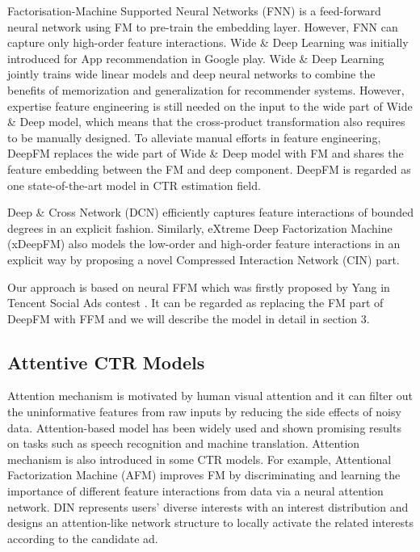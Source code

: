\documentclass{article}
\begin{document}
Factorisation-Machine Supported Neural Networks (FNN)\cite{zhang2016deep} is a feed-forward neural network using FM to pre-train the embedding layer. However, FNN can capture only high-order feature interactions. Wide \& Deep Learning\cite{cheng2016wide} was initially introduced for App recommendation in Google play. Wide \& Deep Learning jointly trains wide linear models and deep neural networks to combine the benefits of memorization and generalization for recommender systems. However, expertise feature engineering is still needed on the input to the wide part of Wide \& Deep model, which means that the cross-product transformation also requires to be manually designed. To alleviate manual efforts in feature engineering, DeepFM\cite{guo2017deepfm} replaces the wide part of Wide \& Deep model with FM and shares the feature embedding between the FM and deep component.  DeepFM is regarded as one state-of-the-art model in CTR estimation field.


Deep \& Cross Network (DCN)\cite{wang2017deep} efficiently captures feature interactions of bounded degrees in an explicit fashion. Similarly, eXtreme Deep Factorization Machine (xDeepFM) \cite{lian2018xdeepfm} also models the low-order and high-order feature interactions in an explicit way by proposing a novel Compressed Interaction Network (CIN) part. 


Our approach is based on neural FFM which was firstly proposed by Yang\cite{yang2017} in Tencent Social Ads contest . It can be regarded as replacing the FM part of DeepFM with FFM and we will describe the model in detail in section 3.

\subsection{Attentive CTR Models}
Attention mechanism is motivated by human visual attention and it can filter out the uninformative features from raw inputs by reducing the side effects of noisy data. Attention-based model has been widely used and shown promising results on tasks such as speech recognition and machine translation. Attention mechanism is also introduced in some CTR models. For example, Attentional  Factorization Machine (AFM)\cite{xiao2017attentional} improves FM by discriminating and learning the importance of different feature interactions from data via a neural attention network. DIN\cite{zhou2018deep} represents users' diverse interests with an interest distribution and designs an attention-like network structure to locally activate the related interests according to the candidate ad.
\end{document}
